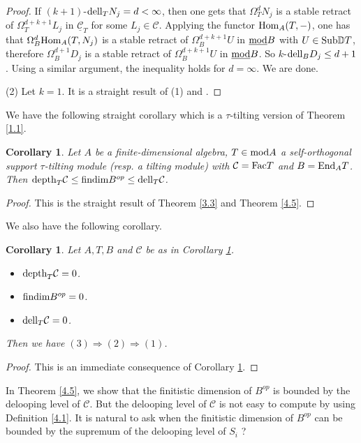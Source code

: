 \documentclass[a4paper]{amsart}
\newtheorem{cor}[thm]{Corollary}
\theoremstyle{definition}
\theoremstyle{remark}
\numberwithin{equation}{section}
\begin{document}
\begin{proof}
If $(k+1)$-${\rm dell}_T N_j=d<\infty$, then one gets that $\Omega_T^{d}N_j$ is a stable retract of $\Omega_T^{d+k+1}L_j$ in $\underline{\mathcal{C}}_T$ for some $L_j\in \mathcal{C}$. Applying the functor ${\rm Hom}_A(T,-)$, one has that $\Omega_B^{d}{\rm Hom}_A(T, N_j)$ is a stable retract of $\Omega_B^{d+k+1}U$ in $\underline{\rm mod}B$ with $U\in{\rm Sub}\mathbb{D}T$, therefore $\Omega_B^{d+1}D_j$ is a stable retract of $\Omega_B^{d+k+1}U$ in $\underline{\rm mod}B$. So $k$-${\rm dell}_B D_j\leq d+1$. Using a similar argument, the inequality holds for $d=\infty$.
We are done.


(2) Let $k=1$. It is a straight result of (1) and \cite[Proposition 1.3,]{G}.
\end{proof}

We have the following straight corollary which is a $\tau$-tilting version of Theorem \ref{1.1}.

\begin{cor}\label{4.6}
 Let $A$ be a finite-dimensional algebra, $T\in{\rm mod}A$ a self-orthogonal support $\tau$-tilting module (resp. a tilting module) with $\mathcal{C}={\rm Fac}T$ and $B={\rm End}_A T$. Then
 ${\rm depth}_T \mathcal{C}\leq {\rm findim} B^{op}\leq {\rm dell}_T\mathcal{C}$.
\end{cor}

\begin{proof} This is the straight result of Theorem \ref{3.3} and Theorem \ref{4.5}.
\end{proof}

We also have the following corollary.

\begin{cor}\label{4.7}
 Let $A,T, B$ and $\mathcal{C}$ be as in Corollary \ref{4.6}.
\begin{itemize}
    \item
    [(1)] $\textup{depth}_T \mathcal{C} = 0$.
    \item
    [(2)] $\textup{findim}B^{op} = 0$.
    \item
    [(3)] $\textup{dell}_T \mathcal{C} = 0$.
\end{itemize}
Then we have $(3)\Rightarrow(2)\Rightarrow (1)$.
\end{cor}

\begin{proof}
This is an immediate consequence of Corollary \ref{4.6}.
\end{proof}

In Theorem \ref{4.5}, we show that the finitistic dimension of $B^{op}$ is bounded by the delooping level of $\mathcal{C}$. But the delooping level of  $\mathcal{C}$ is not easy to compute by using Definition \ref{4.1}. It is natural to ask when the finitistic dimension of $B^{op}$ can be bounded by the supremum of the delooping level of $S_i$ ?
\end{document}
